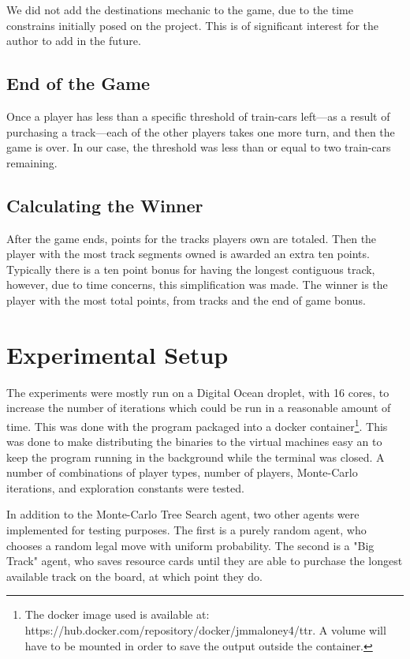 \documentclass[11pt, letterpaper, twoside]{article}
\begin{document}
We did not add the destinations mechanic to the game, due to the time constrains initially posed on the project. This is of significant interest for the author to add in the future. 


\subsection{End of the Game}

Once a player has less than a specific threshold of train-cars left---as a result of purchasing a track---each of the other players takes one more turn, and then the game is over. In our case, the threshold was less than or equal to two train-cars remaining.

\subsection{Calculating the Winner}

After the game ends, points for the tracks players own are totaled. Then the player with the most track segments owned is awarded an extra ten points. Typically there is a ten point bonus for having the longest contiguous track, however, due to time concerns, this simplification was made. The winner is the player with the most total points, from tracks and the end of game bonus.

\section{Experimental Setup}

The experiments were mostly run on a Digital Ocean droplet, with 16 cores, to increase the number of iterations which could be run in a reasonable amount of time. This was done with the program packaged into a docker container\footnote{The docker image used is available at: https://hub.docker.com/repository/docker/jmmaloney4/ttr. A volume will have to be mounted in order to save the output outside the container. }. This was done to make distributing the binaries to the virtual machines easy an to keep the program running in the background while the terminal was closed. A number of combinations of player types, number of players, Monte-Carlo iterations, and exploration constants were tested. 

In addition to the Monte-Carlo Tree Search agent, two other agents were implemented for testing purposes. The first is a purely random agent, who chooses a random legal move with uniform probability. The second is a "Big Track" agent, who saves resource cards until they are able to purchase the longest available track on the board, at which point they do. 
\end{document}
